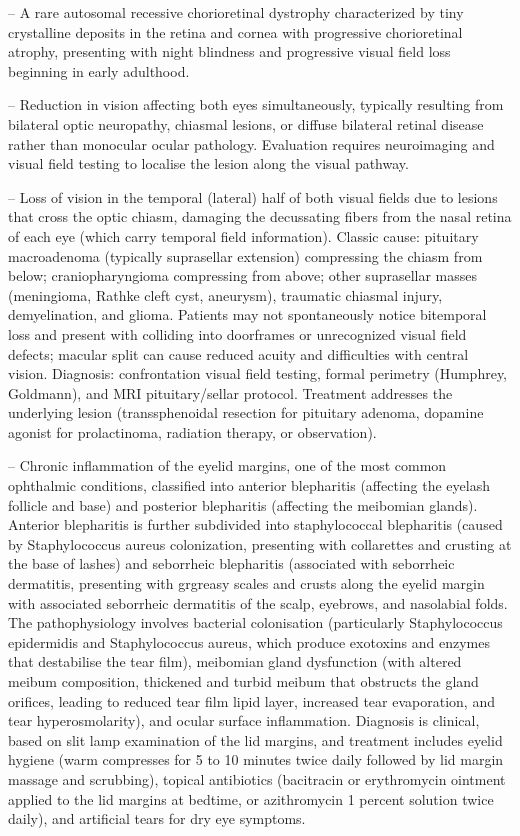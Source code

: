 -- A rare autosomal recessive chorioretinal dystrophy characterized by tiny crystalline deposits in the retina and cornea with progressive chorioretinal atrophy, presenting with night blindness and progressive visual field loss beginning in early adulthood.

-- Reduction in vision affecting both eyes simultaneously, typically resulting from bilateral optic neuropathy, chiasmal lesions, or diffuse bilateral retinal disease rather than monocular ocular pathology. Evaluation requires neuroimaging and visual field testing to localise the lesion along the visual pathway.

-- Loss of vision in the temporal (lateral) half of both visual fields due to lesions that cross the optic chiasm, damaging the decussating fibers from the nasal retina of each eye (which carry temporal field information). Classic cause: pituitary macroadenoma (typically suprasellar extension) compressing the chiasm from below; craniopharyngioma compressing from above; other suprasellar masses (meningioma, Rathke cleft cyst, aneurysm), traumatic chiasmal injury, demyelination, and glioma. Patients may not spontaneously notice bitemporal loss and present with colliding into doorframes or unrecognized visual field defects; macular split can cause reduced acuity and difficulties with central vision. Diagnosis: confrontation visual field testing, formal perimetry (Humphrey, Goldmann), and MRI pituitary/sellar protocol. Treatment addresses the underlying lesion (transsphenoidal resection for pituitary adenoma, dopamine agonist for prolactinoma, radiation therapy, or observation).

-- Chronic inflammation of the eyelid margins, one of the most common ophthalmic conditions, classified into anterior blepharitis (affecting the eyelash follicle and base) and posterior blepharitis (affecting the meibomian glands). Anterior blepharitis is further subdivided into staphylococcal blepharitis (caused by Staphylococcus aureus colonization, presenting with collarettes and crusting at the base of lashes) and seborrheic blepharitis (associated with seborrheic dermatitis, presenting with grgreasy scales and crusts along the eyelid margin with associated seborrheic dermatitis of the scalp, eyebrows, and nasolabial folds. The pathophysiology involves bacterial colonisation (particularly Staphylococcus epidermidis and Staphylococcus aureus, which produce exotoxins and enzymes that destabilise the tear film), meibomian gland dysfunction (with altered meibum composition, thickened and turbid meibum that obstructs the gland orifices, leading to reduced tear film lipid layer, increased tear evaporation, and tear hyperosmolarity), and ocular surface inflammation. Diagnosis is clinical, based on slit lamp examination of the lid margins, and treatment includes eyelid hygiene (warm compresses for 5 to 10 minutes twice daily followed by lid margin massage and scrubbing), topical antibiotics (bacitracin or erythromycin ointment applied to the lid margins at bedtime, or azithromycin 1 percent solution twice daily), and artificial tears for dry eye symptoms.

